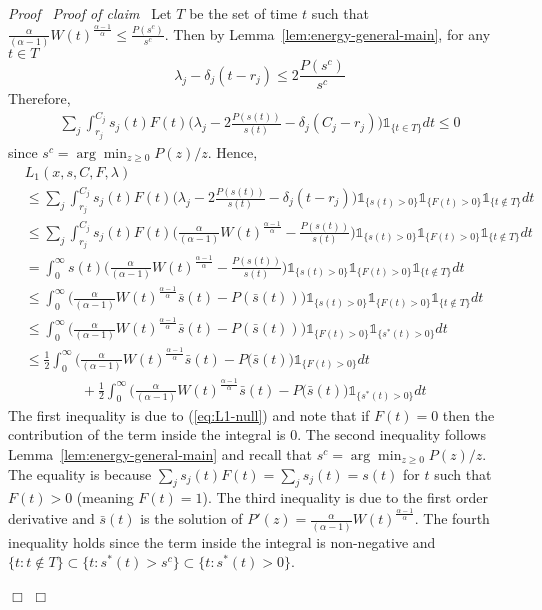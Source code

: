 \documentclass[11pt]{article}
\newenvironment{proof}{\noindent\emph{Proof\ }}{\hspace*{\fill}$\Box$\medskip}
\newenvironment{claimproof}{\noindent\emph{Proof of claim\ }}{\hspace*{\fill}$\Box$\medskip}
\newcommand{\one}{\ensuremath{\mathds{1}}}
\begin{document}
\begin{proof}
\begin{claimproof}
Let $T$ be the set of time $t$ such that 
$\frac{\alpha}{(\alpha-1)} W(t)^{\frac{\alpha-1}{\alpha}} \leq \frac{P(s^{c})}{ s^{c}}$.
Then by Lemma~\ref{lem:energy-general-main}, for any $t \in T$
$$
\lambda_{j} - \delta_{j} (t-r_{j})
\leq 2 \frac{P(s^{c})}{ s^{c}}
$$
Therefore,
\begin{align}	\label{eq:L1-null}
\sum_{j} \int_{r_{j}}^{C_{j}} s_{j}(t)F(t)
	\biggl( \lambda_{j} - 2\frac{P(s(t))}{s(t)} 
								- \delta_{j}(C_{j} - r_{j}) \biggl) \one_{\{t \in T\}}dt \leq 0	
\end{align}
since $s^{c} = \arg \min_{z \geq 0} P(z)/z$. Hence, 
\begin{align*}
&L_{1}(x,s,C, F, \lambda) \\
&\leq \sum_{j} \int_{r_{j}}^{C_{j}} s_{j}(t)F(t)
			\biggl( \lambda_{j} - 2\frac{P(s(t))}{s(t)} 
						- \delta_{j}(t - r_{j}) \biggl)  \one_{\{s(t) > 0\}} \one_{\{F(t) > 0\}} \one_{\{t \notin T\}} dt \\
&\leq \sum_{j} \int_{r_{j}}^{C_{j}} s_{j}(t)F(t)
			\biggl( \frac{\alpha}{(\alpha-1)} W(t)^{\frac{\alpha-1}{\alpha}} - \frac{P(s(t))}{s(t)} \biggl)  
				\one_{\{s(t) > 0\}}  \one_{\{F(t) > 0\}}  \one_{\{t \notin T\}} dt \\	
&= \int_{0}^{\infty} s(t)
			\biggl( \frac{\alpha}{(\alpha-1)} W(t)^{\frac{\alpha-1}{\alpha}} - \frac{P(s(t))}{s(t)} \biggl)  
				\one_{\{s(t) > 0\}}  \one_{\{F(t) > 0\}}  \one_{\{t \notin T\}} dt \\
&\leq \int_{0}^{\infty} 
			\biggl( \frac{\alpha}{(\alpha-1)} W(t)^{\frac{\alpha-1}{\alpha}} \bar{s}(t) - P(\bar{s}(t)) \biggl) 
				\one_{\{s(t) > 0\}}  \one_{\{F(t) > 0\}}  \one_{\{t \notin T\}} dt \\
&\leq \int_{0}^{\infty}
			\biggl( \frac{\alpha}{(\alpha-1)} W(t)^{\frac{\alpha-1}{\alpha}} \bar{s}(t) - P(\bar{s}(t)) \biggl)   
				 \one_{\{F(t) > 0\}}   \one_{\{s^{*}(t) > 0\}} dt \\							
&\leq \frac{1}{2}  \int_{0}^{\infty} 
			\biggl( \frac{\alpha}{(\alpha-1)} W(t)^{\frac{\alpha-1}{\alpha}} \bar{s}(t) 
					- P(\bar{s}(t) \biggl)  \one_{\{F(t) > 0\}} dt \\
			& \qquad \qquad + \frac{1}{2}  \int_{0}^{\infty} 
			\biggl( \frac{\alpha}{(\alpha-1)} W(t)^{\frac{\alpha-1}{\alpha}} \bar{s}(t) 
					- P(\bar{s}(t) \biggl)  \one_{\{s^{*}(t) > 0\}} dt
\end{align*}
The first inequality is due to (\ref{eq:L1-null}) and note that if $F(t) = 0$ then the contribution of the term 
inside the integral is 0. The second inequality follows Lemma~\ref{lem:energy-general-main} and 
recall that  $s^{c} = \arg \min_{z \geq 0} P(z)/z$. 
The equality is because $\sum_{j} s_{j}(t)F(t) = \sum_{j} s_{j}(t) = s(t)$
for $t$ such that $F(t) > 0$ (meaning $F(t) = 1$).
The third inequality is due to the first order derivative and $\bar{s}(t)$ is the solution of  
$P'(z) = \frac{\alpha}{(\alpha-1)} W(t)^{\frac{\alpha-1}{\alpha}}$. 
The fourth inequality holds since the term inside the integral is non-negative
and $\{t: t \notin T\} \subset \{t: s^{*}(t) > s^{c}\} \subset \{t: s^{*}(t) > 0\}$.



\end{claimproof}
\end{proof}
\end{document}
